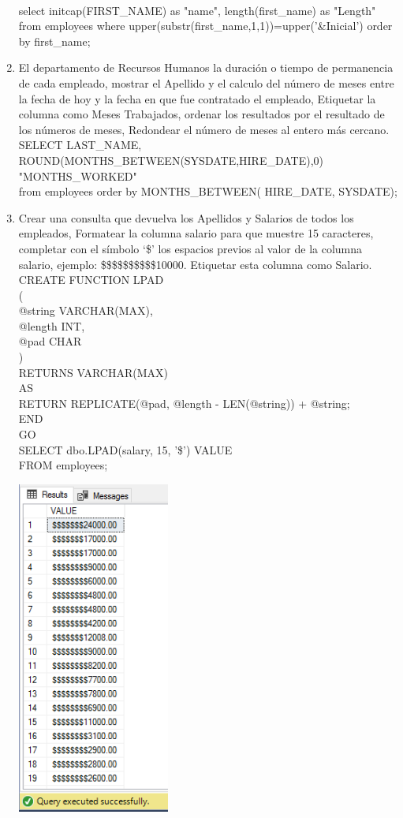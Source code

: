\begin{enumerate}[1.]
	\\select initcap(FIRST\_NAME) as "name", length(first\_name) as "Length" from employees where upper(substr(first\_name,1,1))=upper('\&Inicial') order by first\_name;
	\item El departamento de Recursos Humanos la duración o tiempo de permanencia de cada empleado, mostrar el Apellido y el calculo del número de meses entre la fecha de hoy y la fecha en que fue contratado el empleado, Etiquetar la columna como Meses Trabajados, ordenar los resultados por el resultado de los n\'umeros de meses, Redondear el número de meses al entero más cercano.
	\\SELECT LAST\_NAME, ROUND(MONTHS\_BETWEEN(SYSDATE,HIRE\_DATE),0) "MONTHS\_WORKED"
  \\from employees order by MONTHS\_BETWEEN( HIRE\_DATE, SYSDATE);
	\item Crear una consulta que devuelva los Apellidos y Salarios de todos los empleados, Formatear la columna salario para que muestre 15 caracteres, completar con el símbolo ‘\$’ los espacios previos al valor de la columna salario, ejemplo: \$\$\$\$\$\$\$\$\$\$10000. Etiquetar esta columna como Salario.
	\\CREATE FUNCTION LPAD
\\(
   \\ @string VARCHAR(MAX), 
    \\@length INT,          
    \\@pad CHAR             
\\)
\\RETURNS VARCHAR(MAX)
\\AS
\BEGIN
    \\RETURN REPLICATE(@pad, @length - LEN(@string)) + @string;
\\END
\\GO
\\SELECT dbo.LPAD(salary, 15, '\$') VALUE
\\FROM employees;
\begin{center}
	\includegraphics[width=5cm]{./Imagenes/actividad_05_07}

\end{center}
\end{enumerate}

